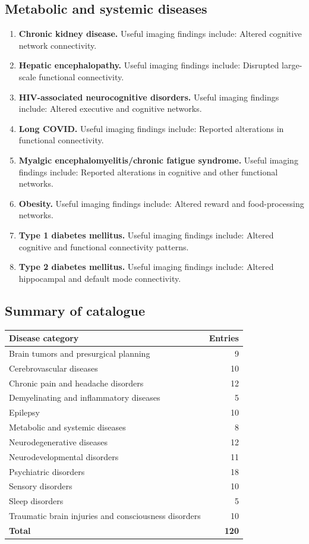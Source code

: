 \subsection{Metabolic and systemic diseases}
\begin{enumerate}[leftmargin=*,itemsep=0.45em,topsep=0.4em]
\item \textbf{Chronic kidney disease.} Useful imaging findings include: Altered cognitive network connectivity.
\item \textbf{Hepatic encephalopathy.} Useful imaging findings include: Disrupted large-scale functional connectivity.
\item \textbf{HIV-associated neurocognitive disorders.} Useful imaging findings include: Altered executive and cognitive networks.
\item \textbf{Long COVID.} Useful imaging findings include: Reported alterations in functional connectivity.
\item \textbf{Myalgic encephalomyelitis/chronic fatigue syndrome.} Useful imaging findings include: Reported alterations in cognitive and other functional networks.
\item \textbf{Obesity.} Useful imaging findings include: Altered reward and food-processing networks.
\item \textbf{Type 1 diabetes mellitus.} Useful imaging findings include: Altered cognitive and functional connectivity patterns.
\item \textbf{Type 2 diabetes mellitus.} Useful imaging findings include: Altered hippocampal and default mode connectivity.
\end{enumerate}

\subsection{Summary of catalogue}
\begin{center}
\begin{tabular}{@{}p{}r@{}}
\toprule
\textbf{Disease category} & \textbf{Entries} \\
\midrule
Brain tumors and presurgical planning & 9 \\
Cerebrovascular diseases & 10 \\
Chronic pain and headache disorders & 12 \\
Demyelinating and inflammatory diseases & 5 \\
Epilepsy & 10 \\
Metabolic and systemic diseases & 8 \\
Neurodegenerative diseases & 12 \\
Neurodevelopmental disorders & 11 \\
Psychiatric disorders & 18 \\
Sensory disorders & 10 \\
Sleep disorders & 5 \\
Traumatic brain injuries and consciousness disorders & 10 \\
\midrule
\textbf{Total} & \textbf{120} \\
\bottomrule
\end{tabular}
\end{center}

